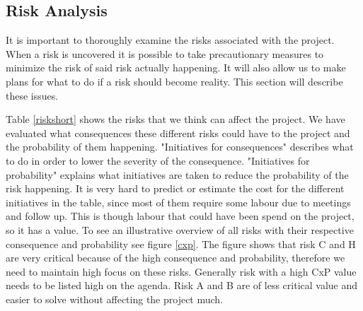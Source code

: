 \subsection{Risk Analysis}
\label{risk}
It is important to thoroughly examine the risks associated with the project. When a risk is uncovered it is possible to take precautionary measures to minimize the risk of said risk actually happening. It will also allow us to make plans for what to do if a risk should become reality. This section will describe these issues.

Table \ref{riskshort} shows the risks that we think can affect the project. 
We have evaluated what consequences these different risks could have to the project and the probability of them happening.
"Initiatives for consequences" describes what to do in order to lower the severity of the consequence.
"Initiatives for probability" explains what initiatives are taken to reduce the probability of the risk happening.
It is very hard to predict or estimate the cost for the different initiatives in the table, since most of them require some labour due to meetings and follow up. 
This is though labour that could have been spend on the project, so it has a value. 
To see an illustrative overview of all risks with their respective consequence and probability see figure \ref{cxp}.
The figure shows that risk C and H are very critical because of the high consequence and probability, therefore we need to maintain high focus on these risks. Generally risk with a high CxP value needs to be listed high on the agenda. 
Risk A and B are of less critical value and easier to solve without affecting the project much.


